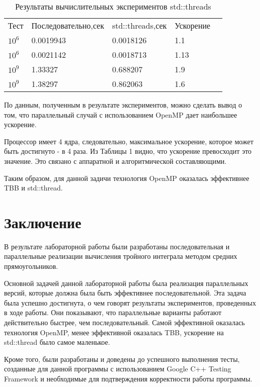 \documentclass{report}
\begin{document}
\begin{table}[!h]
\centering
\begin{tabular}{lllll}
Тест & Последовательно,сек & std::threads,сек & Ускорение  \\
$10^6$ & 0.0019943 & 0.0018126 & 1.1  \\
$10^6$ & 0.0021142 & 0.0018713 & 1.13  \\
$10^9$ & 1.33327 & 0.688207 & 1.9  \\
$10^9$ & 1.38297 & 0.862063 & 1.6 
\end{tabular}
\caption{Результаты вычислительных экспериментов std::threads}
\end{table}

\par По данным, полученным в результате экспериментов, можно сделать вывод о том, что параллельный случай с использованием OpenMP дает наибольшее ускорение.
\par Процессор имеет 4 ядра, следовательно, максимальное ускорение, которое может быть достигнуто - в 4 раза. Из Таблицы 1 видно, что ускорение превосходит это значение. Это связано с аппаратной и алгоритмической составляющими.
\par Таким образом, для данной задичи технология OpenMP оказалась эффективнее TBB и std::thread.


\newpage

\section*{Заключение}
В результате лабораторной работы были разработаны последовательная и параллельные реализации вычисления тройного интеграла методом средних прямоугольников.
\par Основной задачей данной лабораторной работы была реализация параллельных версий, которые должна была быть эффективнее последовательной. Эта задача была успешно достигнута, о чем говорят результаты экспериментов, проведенных в ходе работы. Они показывают, что параллельные варианты работают действительно быстрее, чем последовательный. Самой эффективной оказалась технология OpenMP, менее эффективной оказалась TBB, ускорение на std::thread было самое маленькое.
\par Кроме того, были разработаны и доведены до успешного выполнения тесты, созданные для данной программы с использованием Google C++ Testing Framework и необходимые для подтверждения корректности работы программы.
\newpage
\end{document}
